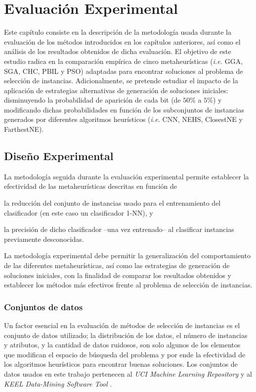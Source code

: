 \chapter{Evaluación Experimental}
\label{capitulo4}

Este capítulo consiste en la descripción de la metodología usada durante la evaluación de los métodos introducidos en los capítulos anteriores, así como el análisis de los resultados obtenidos de dicha evaluación. El objetivo de este estudio radica en la comparación empírica de cinco metaheurísticas (\emph{i.e.} GGA, SGA, CHC, PBIL y PSO) adaptadas para encontrar soluciones al problema de selección de instancias. Adicionalmente, se pretende estudiar el impacto de la aplicación de estrategias alternativas de generación de soluciones iniciales: disminuyendo la probabilidad de aparición de cada bit (de $50\%$ a $5\%$) y modificando dichas probabilidades en función de los subconjuntos de instancias generados por diferentes algoritmos heurísticos (\emph{i.e.} CNN, NEHS, ClosestNE y FarthestNE).

\section{Diseño Experimental}

La metodología seguida durante la evaluación experimental permite establecer la efectividad de las metaheurísticas descritas en función de
\begin{inparaenum}
\item la reducción del conjunto de instancias usado para el entrenamiento del clasificador (en este caso un clasificador 1-NN), y
\item la precisión de dicho clasificador --una vez entrenado-- al clasificar instancias previamente desconocidas.
\end{inparaenum}
La metodología experimental debe permitir la generalización del comportamiento de las diferentes metaheurísticas, así como las estrategias de generación de soluciones iniciales, con la finalidad de comparar los resultados obtenidos y establecer los métodos más efectivos frente al problema de selección de instancias.

\subsection{Conjuntos de datos}
\label{data-section}

Un factor esencial en la evaluación de métodos de selección de instancias es el conjunto de datos utilizado; la distribución de los datos, el número de instancias y atributos, y la cantidad de datos ruidosos, son solo algunos de los elementos que modifican el espacio de búsqueda del problema y por ende la efectividad de los algoritmos heurísticos para encontrar buenas soluciones. Los conjuntos de datos usados en este trabajo pertenecen al \emph{UCI Machine Learning Repository} \cite{BacheLichman:2013} y al \emph{KEEL Data-Mining Software Tool} \cite{alcala2010keel}.

